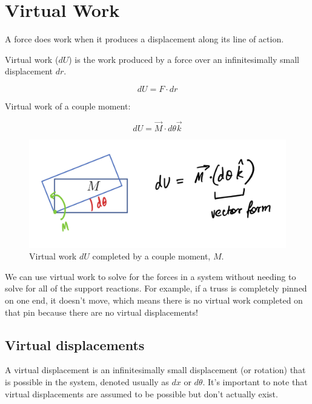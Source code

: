 \section{Virtual Work}

A force does work when it produces a displacement along its line of action. 

Virtual work ($dU$) is the work produced by a force over an infinitesimally small displacement $dr$.

\[dU = F\cdot dr\]

Virtual work of a couple moment: 

\[dU = \Vec{M}\cdot d\theta \Vec{k}\]

\begin{figure}[!h]
\centering
\includegraphics[angle=0, width=5 in]{VWorkFigures/VWorkCoupleMoment.png}
\vspace{-2mm}
\caption{\small Virtual work $dU$ completed by a couple moment, $M$. }
\vspace{-3mm}
\label{Fig:VWorkCoupleMoment}
\end{figure}

We can use virtual work to solve for the forces in a system without needing to solve for all of the support reactions. For example, if a truss is completely pinned on one end, it doesn't move, which means there is no virtual work completed on that pin because there are no virtual displacements!

\subsection{Virtual displacements}
A virtual displacement is an infinitesimally small displacement (or rotation) that is possible in the system, denoted usually as $dx$ or $d\theta$. It's important to note that virtual displacements are assumed to be possible but don't actually exist. 

